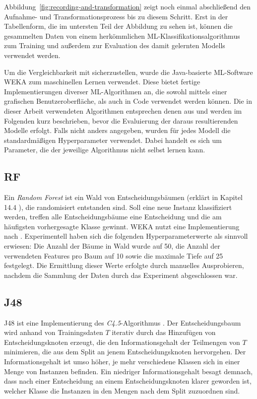 Abbildung~\ref{fig:recording-and-transformation} zeigt noch einmal abschließend den Aufnahme- und Transformationsprozess bis zu diesem Schritt. Erst in der Tabellenform, die im untersten Teil der Abbildung zu sehen ist, können die gesammelten Daten von einem herkömmlichen \ac{ML}-Klassifikationsalgorithmus zum Training und außerdem zur Evaluation des damit gelernten Modells verwendet werden.

Um die Vergleichbarkeit mit \cite{Weiss2016} sicherzustellen, wurde die Java-basierte \ac{ML}-Software WEKA zum maschinellen Lernen verwendet. Diese bietet fertige Implementierungen diverser \ac{ML}-Algorithmen an, die sowohl mittels einer grafischen Benutzeroberfläche, als auch in Code verwendet werden können. Die in dieser Arbeit verwendeten Algorithmen entsprechen denen aus \cite{Weiss2016} und werden im Folgenden kurz beschrieben, bevor die Evaluierung der daraus resultierenden Modelle erfolgt. Falls nicht anders angegeben, wurden für jedes Modell die standardmäßigen Hyperparameter verwendet. Dabei handelt es sich um Parameter, die der jeweilige Algorithmus nicht selbst lernen kann.

\subsection{\acf{RF}}
Ein \textit{Random Forest} ist ein Wald von Entscheidungsbäumen (erklärt in Kapitel 14.4 \cite{Bishop2006}), die randomisiert entstanden sind. Soll eine neue Instanz klassifiziert werden, treffen alle Entscheidungsbäume eine Entscheidung und die am häufigsten vorhergesagte Klasse gewinnt. WEKA nutzt eine Implementierung nach \cite{Breiman2001}. Experimentell haben sich die folgenden Hyperparameterwerte als sinnvoll erwiesen: Die Anzahl der Bäume in Wald wurde auf 50, die Anzahl der verwendeten Features pro Baum auf 10 sowie die maximale Tiefe auf 25 festgelegt. Die Ermittlung dieser Werte erfolgte durch manuelles Ausprobieren, nachdem die Sammlung der Daten durch das Experiment abgeschlossen war.
\subsection{\acf{J48}}
J48 ist eine Implementierung des \textit{C4.5}-Algorithmus \cite{Quinlan1993}. Der Entscheidungsbaum wird anhand von Trainingsdaten $T$ iterativ durch das Hinzufügen von Entscheidungsknoten erzeugt, die den Informationsgehalt der Teilmengen von $T$ minimieren, die aus dem Split an jenem Entscheidungsknoten hervorgehen. Der Informationsgehalt ist umso höher, je mehr verschiedene Klassen sich in einer Menge von Instanzen befinden. Ein niedriger Informationsgehalt besagt demnach, dass nach einer Entscheidung an einem Entscheidungsknoten klarer geworden ist, welcher Klasse die Instanzen in den Mengen nach dem Split zuzuordnen sind.
